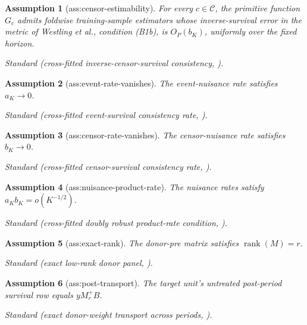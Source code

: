 \documentclass{article}
\newtheorem{assumption}{Assumption}
\begin{document}
\begin{assumption}[ass:censor-estimability]\label{ass:censor-estimability}
For every \(c\in\mathcal C\), the primitive function \(G_c\) admits foldwise training-sample estimators whose inverse-survival error in the metric of Westling et al., condition (B1b), is \(O_P(b_K)\), uniformly over the fixed horizon.
\par\smallskip\noindent\emph{Standard} (cross-fitted inverse-censor-survival consistency, \cite{WestlingLuedtkeGilbertCarone2024}).
\end{assumption}

\begin{assumption}[ass:event-rate-vanishes]\label{ass:event-rate-vanishes}
The event-nuisance rate satisfies \(a_K\to0\).
\par\smallskip\noindent\emph{Standard} (cross-fitted event-survival consistency rate, \cite{WestlingLuedtkeGilbertCarone2024}).
\end{assumption}

\begin{assumption}[ass:censor-rate-vanishes]\label{ass:censor-rate-vanishes}
The censor-nuisance rate satisfies \(b_K\to0\).
\par\smallskip\noindent\emph{Standard} (cross-fitted censor-survival consistency rate, \cite{WestlingLuedtkeGilbertCarone2024}).
\end{assumption}

\begin{assumption}[ass:nuisance-product-rate]\label{ass:nuisance-product-rate}
The nuisance rates satisfy \(a_Kb_K=o(K^{-1/2})\).
\par\smallskip\noindent\emph{Standard} (cross-fitted doubly robust product-rate condition, \cite{WestlingLuedtkeGilbertCarone2024}).
\end{assumption}

\begin{assumption}[ass:exact-rank]\label{ass:exact-rank}
The donor-pre matrix satisfies \(\operatorname{rank}(M)=r\).
\par\smallskip\noindent\emph{Standard} (exact low-rank donor panel, \cite{HanShah2025SSC}).
\end{assumption}

\begin{assumption}[ass:post-transport]\label{ass:post-transport}
The target unit's untreated post-period survival row equals \(yM_r^+B\).
\par\smallskip\noindent\emph{Standard} (exact donor-weight transport across periods, \cite{HanShah2025SSC}).
\end{assumption}
\end{document}
